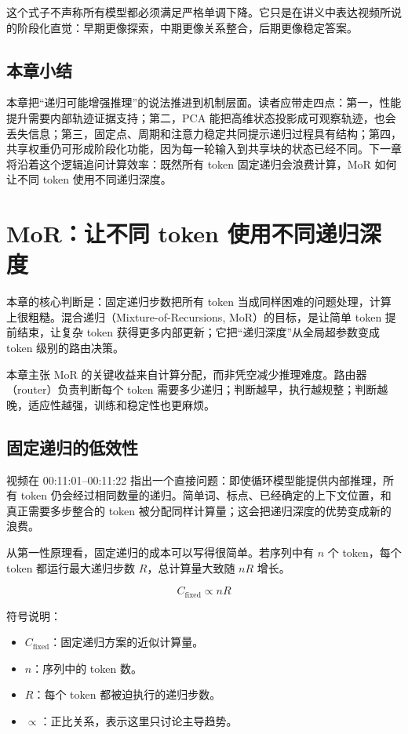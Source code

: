 ﻿\documentclass[a4paper]{article}
\begin{document}
这个式子不声称所有模型都必须满足严格单调下降。它只是在讲义中表达视频所说的阶段化直觉：早期更像探索，中期更像关系整合，后期更像稳定答案。

\subsection{本章小结}

本章把“递归可能增强推理”的说法推进到机制层面。读者应带走四点：第一，性能提升需要内部轨迹证据支持；第二，PCA 能把高维状态投影成可观察轨迹，也会丢失信息；第三，固定点、周期和注意力稳定共同提示递归过程具有结构；第四，共享权重仍可形成阶段化功能，因为每一轮输入到共享块的状态已经不同。下一章将沿着这个逻辑追问计算效率：既然所有 token 固定递归会浪费计算，MoR 如何让不同 token 使用不同递归深度。


\section{MoR：让不同 token 使用不同递归深度}
\label{sec:mixture-of-recursions}

本章的核心判断是：固定递归步数把所有 token 当成同样困难的问题处理，计算上很粗糙。混合递归（Mixture-of-Recursions, MoR）的目标，是让简单 token 提前结束，让复杂 token 获得更多内部更新；它把“递归深度”从全局超参数变成 token 级别的路由决策。

\begin{importantbox}{本章主张}
MoR 的关键收益来自计算分配，而非凭空减少推理难度。路由器（router）负责判断每个 token 需要多少递归；判断越早，执行越规整；判断越晚，适应性越强，训练和稳定性也更麻烦。
\end{importantbox}

\subsection{固定递归的低效性}

视频在 00:11:01--00:11:22 指出一个直接问题：即使循环模型能提供内部推理，所有 token 仍会经过相同数量的递归。简单词、标点、已经确定的上下文位置，和真正需要多步整合的 token 被分配同样计算量；这会把递归深度的优势变成新的浪费。

从第一性原理看，固定递归的成本可以写得很简单。若序列中有 \(n\) 个 token，每个 token 都运行最大递归步数 \(R\)，总计算量大致随 \(nR\) 增长。

\[
C_{\mathrm{fixed}}\propto nR
\]

符号说明：
\begin{itemize}
  \item \(C_{\mathrm{fixed}}\)：固定递归方案的近似计算量。
  \item \(n\)：序列中的 token 数。
  \item \(R\)：每个 token 都被迫执行的递归步数。
  \item \(\propto\)：正比关系，表示这里只讨论主导趋势。
\end{itemize}
\end{document}
